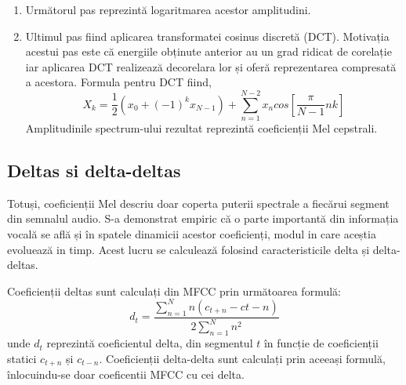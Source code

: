\documentclass[a4paper,12pt]{book}
\begin{document}
\begin{enumerate}
\begin{equation*}
\begin{cases}
							\frac{k-f(m-1)}{f(m) - f(m-1)}&\quad f(m-1)\leq k\leq f(m) \\[5pt]
							\frac{f(m+1)-k}{f(m+1) - f(m)}&\quad f(m)\leq k\leq f(m+1) \\[3pt]
							\quad \quad 0&\quad k>f(m+1)
							\end{cases}
						\end{equation*}
						unde $m$ este numărul frecvenței scalate, iar $k$ este frecvența curentă din spectrum. \newline
						Filtrele triunghiulare sunt înmulțite apoi cu "power spectrum"-ul obținut la pasul anterior și se obțin astfel amplitudinile din fiecare filtru Mel.
						\item Următorul pas reprezintă logaritmarea acestor amplitudini.
						\item Ultimul pas fiind aplicarea transformatei cosinus discretă (DCT). Motivația acestui pas este că energiile obținute anterior au un grad ridicat de corelație iar aplicarea DCT realizează decorelara lor și oferă reprezentarea compresată a acestora.
						Formula pentru DCT fiind,
						\begin{equation*}
							X_k = \frac{1}{2}(x_0 + (-1)^k x_{N-1}) + \sum_{n=1}^{N-2} x_n cos[\frac{\pi}{N-1}nk]
						\end{equation*}
						Amplitudinile spectrum-ului rezultat reprezintă coeficienții Mel cepstrali.
				\end{enumerate} \par
				\subsection{Deltas si delta-deltas}
					Totuși, coeficienții Mel descriu doar coperta puterii spectrale a fiecărui segment din semnalul audio. S-a demonstrat empiric că o parte importantă din informația vocală se află și în spatele dinamicii acestor coeficienți, modul in care aceștia evoluează in timp. Acest lucru se calculează folosind caracteristicile delta și delta-deltas. \par Coeficienții deltas sunt calculați din MFCC prin următoarea formulă:
					\begin{equation*}
						d_t = \frac{\sum_{n=1}^{N} n(c_{t+n}-c{t-n})}{2\sum_{n=1}^{N}n^2}
					\end{equation*}
					unde $d_t$ reprezintă coeficientul delta, din segmentul $t$  în funcție de coeficienții statici $c_{t+n}$ și $c_{t-n}$. 
					Coeficienții delta-delta sunt calculați prin aceeași formulă, înlocuindu-se doar coeficentii MFCC cu cei delta. \par
				
\end{document}
